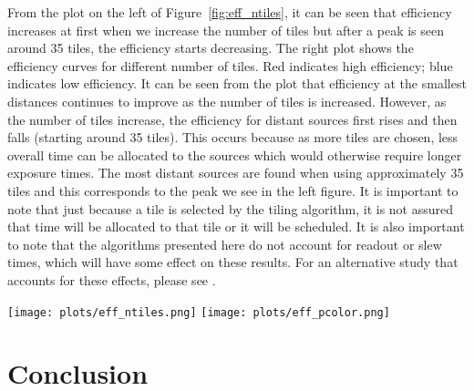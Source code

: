\documentclass[twocolumn]{aastex62}
\begin{document}
From the plot on the left of Figure~\ref{fig:eff_ntiles}, it can be seen that efficiency increases at first when we increase the number of tiles but after a peak is seen around 35 tiles, the efficiency starts decreasing. The right plot shows the efficiency curves for different number of tiles. Red indicates high efficiency; blue indicates low efficiency. It can be seen from the plot that efficiency at the smallest distances continues to improve as the number of tiles is increased. However, as the number of tiles increase, the efficiency for distant sources first rises and then falls (starting around 35 tiles). This occurs because as more tiles are chosen, less overall time can be allocated to the sources which would otherwise require longer exposure times. The most distant sources are found when using approximately 35 tiles and this corresponds to the peak we see in the left figure.
It is important to note that just because a tile is selected by the tiling algorithm, it is not assured that time will be allocated to that tile or it will be scheduled.
It is also important to note that the algorithms presented here do not account for readout or slew times, which will have some effect on these results. For an alternative study that accounts for these effects, please see \cite{ChHu2017}.
\begin{figure*}[t]
    \centering
    \texttt{[image: plots/eff\_ntiles.png]}
    \texttt{[image: plots/eff\_pcolor.png]}
    \caption{On the left is the plot of efficiency weighted average as a function of the number of tiles considered. On the right is efficiency as a function of distance for different number of tiles. In the simulation, hierarchical tiling algorithm, powerlaw time allocation algorithm and greedy scheduling algorithm are used to detect 5000 random injections for number of tiles ranging from 1 to 100. The standard deviation is calculated and the 99\% confidence interval is plotted as the grey shaded region in the top figure. Blue indicates lower efficiency and red indicates higher efficiency. We can see that as the number of tiles increases, low distance gets better but high distance gets worse. We see the least blue at high distance around 35 tiles, which corresponds to the peak in the left plot.}
    \label{fig:eff_ntiles}
\end{figure*}

\section{Conclusion}
\label{sec:conclusions}
\end{document}
